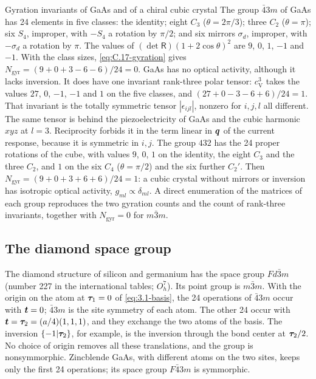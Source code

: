 \begin{workedexample}{Gyration invariants of GaAs and of a chiral cubic crystal}\label{we:C-gyration}
The group $\bar43m$ of GaAs has 24 elements in five classes: the identity; eight $C_3$ ($\theta = 2\pi/3$); three $C_2$ ($\theta = \pi$); six $S_4$, improper, with $-S_4$ a rotation by $\pi/2$; and six mirrors $\sigma_d$, improper, with $-\sigma_d$ a rotation by $\pi$. The values of $(\det\mathsf{R})(1 + 2\cos\theta)^2$ are $9$, $0$, $1$, $-1$ and $-1$. With the class sizes, \cref{eq:C.17-gyration} gives $N_{\mathrm{gyr}} = (9 + 0 + 3 - 6 - 6)/24 = 0$. GaAs has no optical activity, although it lacks inversion. It does have one invariant rank-three polar tensor: $c_{\mathrm{V}}^3$ takes the values $27$, $0$, $-1$, $-1$ and $1$ on the five classes, and $(27 + 0 - 3 - 6 + 6)/24 = 1$. That invariant is the totally symmetric tensor $|\epsilon_{ijl}|$, nonzero for $i, j, l$ all different. The same tensor is behind the piezoelectricity of GaAs and the cubic harmonic $xyz$ at $l = 3$. Reciprocity forbids it in the term linear in $\bm{q}$ of the current response, because it is symmetric in $i, j$. The group $432$ has the 24 proper rotations of the cube, with values $9$, $0$, $1$ on the identity, the eight $C_3$ and the three $C_2$, and $1$ on the six $C_4$ ($\theta = \pi/2$) and the six further $C_2'$. Then $N_{\mathrm{gyr}} = (9 + 0 + 3 + 6 + 6)/24 = 1$: a cubic crystal without mirrors or inversion has isotropic optical activity, $g_{ml} \propto \delta_{ml}$. A direct enumeration of the matrices of each group reproduces the two gyration counts and the count of rank-three invariants, together with $N_{\mathrm{gyr}} = 0$ for $m\bar3m$.
\end{workedexample}

\subsection{The diamond space group}

The diamond structure of silicon and germanium has the space group $Fd\bar3m$ (number 227 in the international tables; $O_h^7$). Its point group is $m\bar3m$. With the origin on the atom at $\bm{\tau}_1 = 0$ of \cref{eq:3.1-basis}, the 24 operations of $\bar43m$ occur with $\bm{t} = 0$; $\bar43m$ is the site symmetry of each atom. The other 24 occur with $\bm{t} = \bm{\tau}_2 = (a/4)(1,1,1)$, and they exchange the two atoms of the basis. The inversion $\{-1|\bm{\tau}_2\}$, for example, is the inversion through the bond center at $\bm{\tau}_2/2$. No choice of origin removes all these translations, and the group is nonsymmorphic. Zincblende GaAs, with different atoms on the two sites, keeps only the first 24 operations; its space group $F\bar43m$ is symmorphic.

